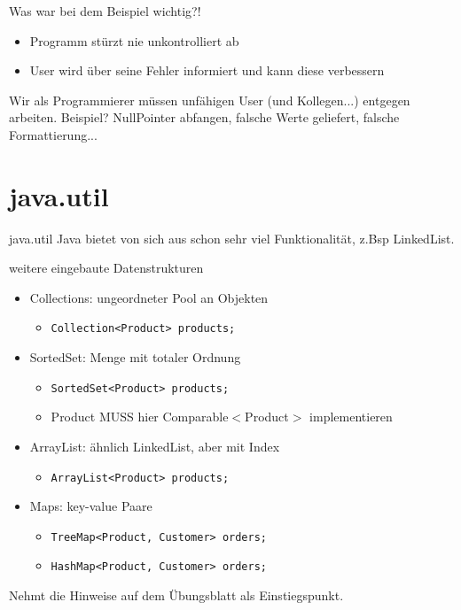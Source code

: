 \documentclass[18pt]{beamer}
\begin{document}
\begin{frame}{Was war bei dem Beispiel wichtig?!}
\pause
\begin{itemize}
	\item Programm stürzt nie unkontrolliert ab \pause
	\item User wird über seine Fehler informiert und kann diese verbessern  \pause
\end{itemize} \pause
Wir als Programmierer müssen unfähigen User (und Kollegen...) entgegen arbeiten. \newline  
Beispiel?  \pause NullPointer abfangen, falsche Werte geliefert, falsche Formattierung...

\end{frame}

\section{java.util}
\begin{frame}[fragile]{java.util}
Java bietet von sich aus schon sehr viel Funktionalität, z.Bsp LinkedList. \pause
\begin{example}{weitere eingebaute Datenstrukturen} \pause
\begin{itemize}
	\item Collections: ungeordneter Pool an Objekten 
	\begin{itemize}
		\item \lstinline{Collection<Product> products;} \pause
	\end{itemize}
	\item SortedSet: Menge mit totaler Ordnung
	\begin{itemize}
		\item \lstinline{SortedSet<Product> products;} \pause
		\item Product MUSS hier Comparable$<$Product$>$ implementieren \pause
	\end{itemize}
	\item ArrayList: ähnlich LinkedList, aber mit Index
	\begin{itemize}
		\item \lstinline{ArrayList<Product> products;} \pause
	\end{itemize}
	\item Maps: key-value Paare 
	\begin{itemize}
		\item \lstinline{TreeMap<Product, Customer> orders;}
		\item \lstinline{HashMap<Product, Customer> orders;}
	\end{itemize}
\end{itemize}
\end{example}
Nehmt die Hinweise auf dem Übungsblatt als Einstiegspunkt.
\end{frame}


\appendix
\beginbackup


\backupend
\end{document}
